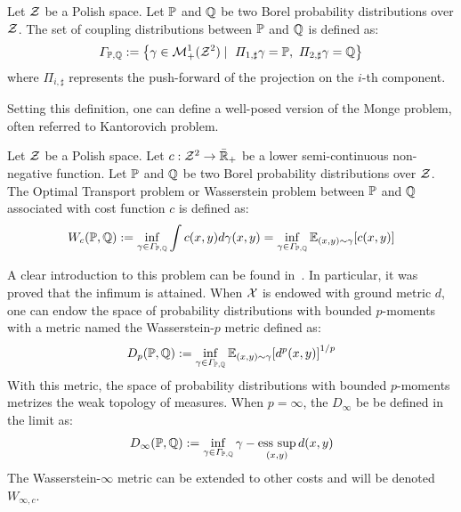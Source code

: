 \begin{definition} 
    Let $\mathcal{Z}$ be a Polish space. Let $\mathbb{P}$ and $\mathbb{Q}$ be two Borel probability distributions over $\mathcal{Z}$. The set of coupling distributions between $\mathbb{P}$ and $\mathbb{Q}$ is defined as:
    \begin{align*}
        \Gamma_{\PP,\QQ}:=\left\{\gamma\in\mathcal{M}^1_+(\ZZ^2)\mid~ \Pi_{1,\sharp}\gamma = \PP,~\Pi_{2,\sharp}\gamma = \QQ\right\}
    \end{align*}
where $\Pi_{i,\sharp}$ represents the push-forward of the projection on the $i$-th component.
\end{definition}
Setting this definition, one can define a well-posed version of the Monge problem, often referred to Kantorovich problem.
\begin{definition}
Let $\mathcal{Z}$ be a Polish space. Let $c:\mathcal{Z}^2\to\bar{\mathbb{R}}_+$ be a lower semi-continuous non-negative function. Let $\mathbb{P}$ and $\mathbb{Q}$ be two  Borel probability distributions over $\mathcal{Z}$. The Optimal Transport problem or Wasserstein problem between $\mathbb{P}$ and $\mathbb{Q}$ associated with cost function $c$ is defined as:
\begin{align*}
    W_c(\PP,\QQ):=\inf_{\gamma\in\Gamma_{\PP,\QQ}}\int c(x,y) d\gamma(x,y) = \inf_{\gamma\in\Gamma_{\PP,\QQ}}\mathbb{E}_{(x,y)\sim\gamma}\left[c(x,y) \right]
\end{align*} 
\end{definition}
A clear introduction to this problem can be found in~\cite{villani2003topics}. In particular, it was proved that the infimum is attained. When $\mathcal{X}$ is endowed with ground metric $d$, one can endow the space of probability distributions with bounded $p$-moments with a metric named the Wasserstein-$p$ metric defined as:
\begin{align*}
    D_p(\PP,\QQ):=\inf_{\gamma\in\Gamma_{\PP,\QQ}}\mathbb{E}_{(x,y)\sim\gamma}\left[d^p(x,y) \right]^{1/p}
\end{align*}
With this metric, the space of probability distributions with bounded $p$-moments metrizes the weak topology of measures. When $p=\infty$, the $D_\infty$ be be defined in the limit as:
\begin{align*}
    D_\infty(\mathbb{P},\mathbb{Q}):=\inf_{\gamma\in\Gamma_{\mathbb{P},\mathbb{Q}}}\gamma-\operatorname*{ess\text{ }sup}_{(x,y)} d(x,y) 
\end{align*}
The Wasserstein-$\infty$ metric can be extended to other costs and will be denoted $W_{\infty,c}$.


